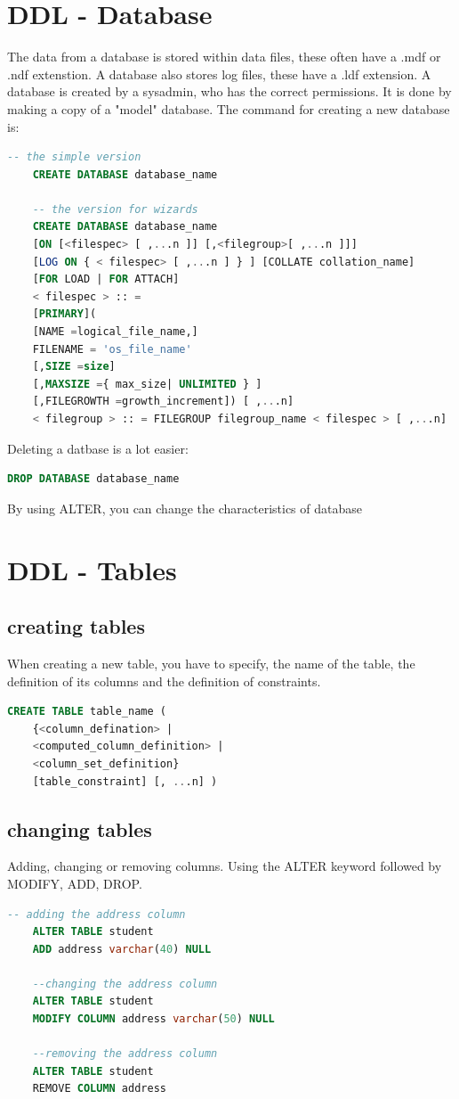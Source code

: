 \documentclass{report}
\begin{document}
	\section{DDL - Database}
	The data from a database is stored within data files, these often have a .mdf or .ndf extenstion. A database also stores log files, these have a .ldf extension.
	A database is created by a sysadmin, who has the correct permissions. It is done by making a copy of a "model" database. 
	The command for creating a new database is: 
	\begin{lstlisting}[language=sql]
	-- the simple version
	CREATE DATABASE database_name
	
	-- the version for wizards
	CREATE DATABASE database_name 
	[ON [<filespec> [ ,...n ]] [,<filegroup>[ ,...n ]]] 
	[LOG ON { < filespec> [ ,...n ] } ] [COLLATE collation_name] 
	[FOR LOAD | FOR ATTACH] 
	< filespec > :: = 
	[PRIMARY](
	[NAME =logical_file_name,] 
	FILENAME = 'os_file_name' 
	[,SIZE =size] 
	[,MAXSIZE ={ max_size| UNLIMITED } ] 
	[,FILEGROWTH =growth_increment]) [ ,...n] 
	< filegroup > :: = FILEGROUP filegroup_name < filespec > [ ,...n]\end{lstlisting}
	Deleting a datbase is a lot easier: 
	\begin{lstlisting}[language=sql]
	DROP DATABASE database_name	\end{lstlisting}
	By using ALTER, you can change the characteristics of database
	\section{DDL - Tables}
	\subsection{creating tables}
	When creating a new table, you have to specify, the name of the table, the definition of its columns and the definition of constraints. 
	\begin{lstlisting}[language=sql]
	CREATE TABLE table_name (
	{<column_defination> | 
	<computed_column_definition> |
	<column_set_definition}
	[table_constraint] [, ...n] )\end{lstlisting}
	
	\subsection{changing tables}
	Adding, changing or removing columns. Using the ALTER keyword followed by MODIFY, ADD, DROP. 
	\begin{lstlisting}[language=sql]
	-- adding the address column
	ALTER TABLE student
	ADD address varchar(40) NULL
	
	--changing the address column
	ALTER TABLE student
	MODIFY COLUMN address varchar(50) NULL
	
	--removing the address column
	ALTER TABLE student
	REMOVE COLUMN address\end{lstlisting}
\end{document}
